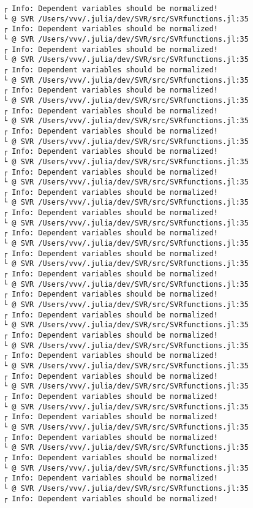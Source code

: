 \documentclass[11pt]{article}
\begin{document}
\begin{Verbatim}[commandchars=\\\{\}]
┌ Info: Dependent variables should be normalized!
└ @ SVR /Users/vvv/.julia/dev/SVR/src/SVRfunctions.jl:35
┌ Info: Dependent variables should be normalized!
└ @ SVR /Users/vvv/.julia/dev/SVR/src/SVRfunctions.jl:35
┌ Info: Dependent variables should be normalized!
└ @ SVR /Users/vvv/.julia/dev/SVR/src/SVRfunctions.jl:35
┌ Info: Dependent variables should be normalized!
└ @ SVR /Users/vvv/.julia/dev/SVR/src/SVRfunctions.jl:35
┌ Info: Dependent variables should be normalized!
└ @ SVR /Users/vvv/.julia/dev/SVR/src/SVRfunctions.jl:35
┌ Info: Dependent variables should be normalized!
└ @ SVR /Users/vvv/.julia/dev/SVR/src/SVRfunctions.jl:35
┌ Info: Dependent variables should be normalized!
└ @ SVR /Users/vvv/.julia/dev/SVR/src/SVRfunctions.jl:35
┌ Info: Dependent variables should be normalized!
└ @ SVR /Users/vvv/.julia/dev/SVR/src/SVRfunctions.jl:35
┌ Info: Dependent variables should be normalized!
└ @ SVR /Users/vvv/.julia/dev/SVR/src/SVRfunctions.jl:35
┌ Info: Dependent variables should be normalized!
└ @ SVR /Users/vvv/.julia/dev/SVR/src/SVRfunctions.jl:35
┌ Info: Dependent variables should be normalized!
└ @ SVR /Users/vvv/.julia/dev/SVR/src/SVRfunctions.jl:35
┌ Info: Dependent variables should be normalized!
└ @ SVR /Users/vvv/.julia/dev/SVR/src/SVRfunctions.jl:35
┌ Info: Dependent variables should be normalized!
└ @ SVR /Users/vvv/.julia/dev/SVR/src/SVRfunctions.jl:35
┌ Info: Dependent variables should be normalized!
└ @ SVR /Users/vvv/.julia/dev/SVR/src/SVRfunctions.jl:35
┌ Info: Dependent variables should be normalized!
└ @ SVR /Users/vvv/.julia/dev/SVR/src/SVRfunctions.jl:35
┌ Info: Dependent variables should be normalized!
└ @ SVR /Users/vvv/.julia/dev/SVR/src/SVRfunctions.jl:35
┌ Info: Dependent variables should be normalized!
└ @ SVR /Users/vvv/.julia/dev/SVR/src/SVRfunctions.jl:35
┌ Info: Dependent variables should be normalized!
└ @ SVR /Users/vvv/.julia/dev/SVR/src/SVRfunctions.jl:35
┌ Info: Dependent variables should be normalized!
└ @ SVR /Users/vvv/.julia/dev/SVR/src/SVRfunctions.jl:35
┌ Info: Dependent variables should be normalized!
└ @ SVR /Users/vvv/.julia/dev/SVR/src/SVRfunctions.jl:35
┌ Info: Dependent variables should be normalized!
└ @ SVR /Users/vvv/.julia/dev/SVR/src/SVRfunctions.jl:35
┌ Info: Dependent variables should be normalized!
└ @ SVR /Users/vvv/.julia/dev/SVR/src/SVRfunctions.jl:35
┌ Info: Dependent variables should be normalized!
└ @ SVR /Users/vvv/.julia/dev/SVR/src/SVRfunctions.jl:35
┌ Info: Dependent variables should be normalized!
└ @ SVR /Users/vvv/.julia/dev/SVR/src/SVRfunctions.jl:35
┌ Info: Dependent variables should be normalized!

\end{Verbatim}
\end{document}
